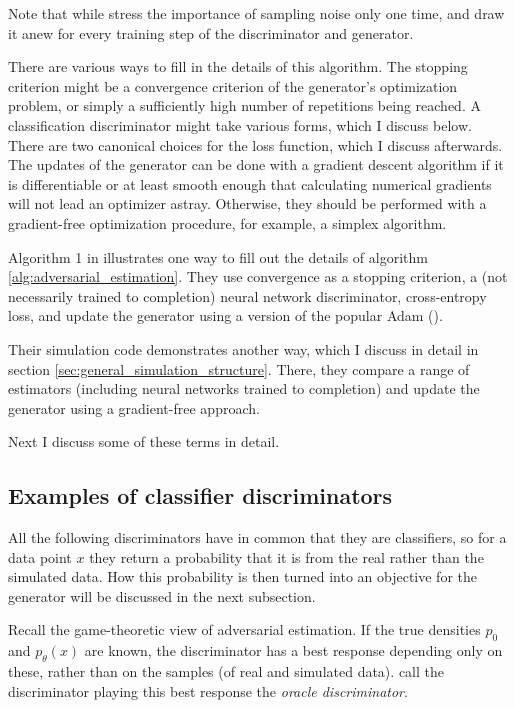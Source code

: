 Note that while \textcite{kaji2023adversarial} stress the importance of sampling noise only one time, \textcite{goodfellow2014generative} and \textcite{athey2021using} draw it anew for every training step of the discriminator and generator.

There are various ways to fill in the details of this algorithm.
The stopping criterion might be a convergence criterion of the generator's optimization problem, or simply a sufficiently high number of repetitions being reached.
A classification discriminator might take various forms, which I discuss below.
There are two canonical choices for the loss function, which I discuss afterwards.
The updates of the generator can be done with a gradient descent algorithm if it is differentiable or at least smooth enough that calculating numerical gradients will not lead an optimizer astray.
Otherwise, they should be performed with a gradient-free optimization procedure, for example, a simplex algorithm. %

Algorithm 1 in \textcite{kaji2023adversarial} illustrates one way to fill out the details of algorithm \ref{alg:adversarial_estimation}.
They use convergence as a stopping criterion, a (not necessarily trained to completion) neural network discriminator, cross-entropy loss, and update the generator using a version of the popular Adam (\cite{diederik2014adam}).

Their simulation code demonstrates another way, which I discuss in detail in section \ref{sec:general_simulation_structure}.
There, they compare a range of estimators (including neural networks trained to completion) and update the generator using a gradient-free approach.

Next I discuss some of these terms in detail.

\subsection{Examples of classifier discriminators}
\label{sec:discriminators}
All the following discriminators have in common that they are classifiers, so for a data point $x$ they return a probability that it is from the real rather than the simulated data.
How this probability is then turned into an objective for the generator will be discussed in the next subsection.

Recall the game-theoretic view of adversarial estimation.
If the true densities $p_0$ and $p_\theta(x)$ are known, the discriminator has a best response depending only on these, rather than on the samples (of real and simulated data).
\textcite{kaji2023adversarial} call the discriminator playing this best response the \textit{oracle discriminator}. %

